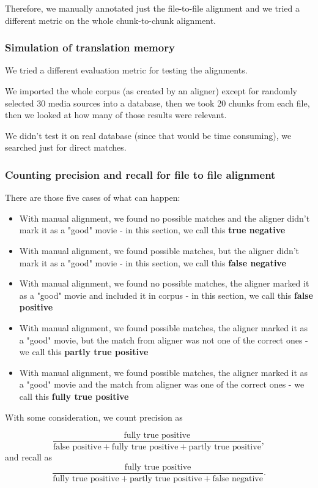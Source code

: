 Therefore, we manually annotated just the file-to-file alignment and we tried a different metric on the whole chunk-to-chunk alignment.

\subsubsection{Simulation of translation memory}
We tried a different evaluation metric for testing the alignments.

We imported the whole corpus (as created by an aligner) except for randomly selected 30 media sources into a database, then we took 20 chunks from each file, then we looked at how many of those results were relevant.

We didn't test it on real database (since that would be time consuming), we searched just for direct matches.

\subsubsection{Counting precision and recall for file to file alignment}
There are those five cases of what can happen:
\begin{itemize}
    \item With manual alignment, we found no possible matches and the aligner didn't mark it as a "good" movie - in this section, we call this \textbf{true negative}
    \item With manual alignment, we found possible matches, but the aligner didn't mark it as a "good" movie - in this section, we call this \textbf{false negative}
    \item With manual alignment, we found no possible matches, the aligner marked it as a "good" movie and included it in corpus - in this section, we call this \textbf{false positive}
    \item With manual alignment, we found possible matches, the aligner marked it as a "good" movie, but the match from aligner was not one of the correct ones -  we call this \textbf{partly true positive}
    \item  With manual alignment, we found possible matches, the aligner marked it as a "good" movie and the match from aligner was  one of the correct ones -  we call this \textbf{fully true positive}
\end{itemize}

With some consideration, we count precision as 

$$\frac{\text{fully true positive}}{\text{false positive}+\text{fully true positive}+\text{partly true positive}},$$ and recall as $$\frac{\text{fully true positive}}{\text{fully true positive}+\text{partly true positive}+\text{false negative}}.$$

